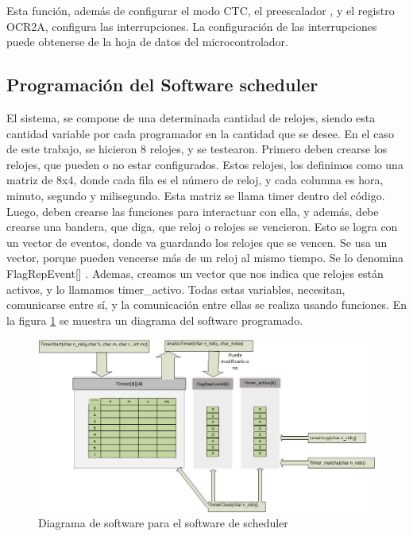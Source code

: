 Esta función, además de configurar el modo CTC, el preescalador , y el registro OCR2A, configura las interrupciones. La configuración de las interrupciones puede obtenerse de la hoja de datos del microcontrolador.

\subsection{Programación del Software scheduler} 

El sistema, se compone de una determinada cantidad de relojes, siendo esta cantidad variable por cada programador en la cantidad que se desee. En el caso de este trabajo, se hicieron 8 relojes, y se testearon.
Primero deben crearse los relojes, que pueden o no estar configurados. Estos relojes, los definimos como una matriz de 8x4, donde cada fila es el número de reloj, y cada columna es hora, minuto, segundo y milisegundo. Esta matriz se llama timer dentro del código. Luego, deben crearse las funciones para interactuar con ella, y además, debe crearse una bandera, que diga, que reloj o relojes se vencieron. Esto se logra con un vector de eventos, donde va guardando los relojes que se vencen. Se usa un vector, porque pueden vencerse más de un reloj al mismo tiempo. Se lo denomina FlagRepEvent[] . Ademas, creamos un vector que nos indica que relojes están activos, y lo llamamos timer\_activo. Todas estas variables, necesitan, comunicarse entre sí, y la comunicación entre ellas se realiza usando funciones. En la figura \ref{fig:soft_sch} se muestra un diagrama del software programado.  


\begin{figure}[ht]
	\includegraphics[width=\linewidth]{software_timer} 
	\caption{Diagrama de software para el software de scheduler}
	\label{fig:soft_sch} 	
\end{figure}

